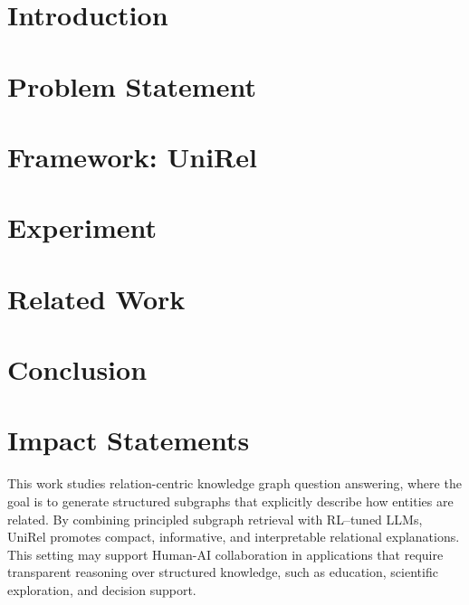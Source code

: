 \documentclass{article}
\theoremstyle{plain}
\theoremstyle{definition}
\theoremstyle{remark}
\begin{document}
\printAffiliationsAndNotice{}  %

\begin{abstract}

\end{abstract}
\section{Introduction}


\section{Problem Statement}


\section{Framework: UniRel}





\section{Experiment}




\section{Related Work}



\section{Conclusion}




\section*{Impact Statements}
This work studies relation-centric knowledge graph question answering, where the goal is to generate structured subgraphs that explicitly describe how entities are related. By combining principled subgraph retrieval with RL–tuned LLMs, UniRel promotes compact, informative, and interpretable relational explanations. This setting may support Human-AI collaboration in applications that require transparent reasoning over structured knowledge, such as education, scientific exploration, and decision support.
\end{document}
